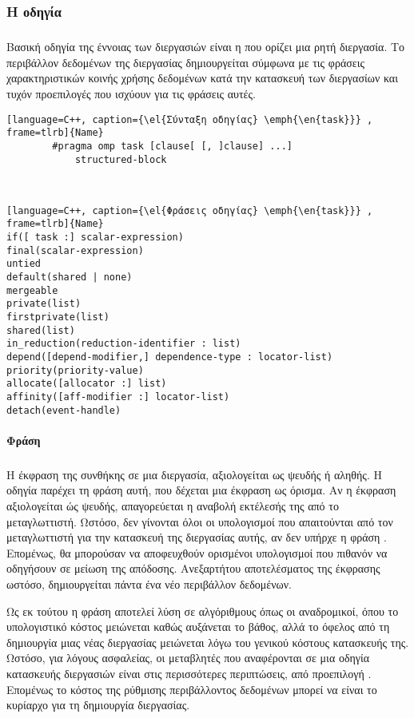 \subsubsection{Η οδηγία \emph{}}
\subparagraph{}
	Βασική οδηγία της έννοιας των διεργασιών είναι η \emph{} που ορίζει μια ρητή διεργασία. Το περιβάλλον δεδομένων της διεργασίας δημιουργείται σύμφωνα με τις φράσεις χαρακτηριστικών κοινής χρήσης δεδομένων κατά την κατασκευή των διεργασίων και τυχόν προεπιλογές που ισχύουν για τις φράσεις αυτές\cite{thenextstep20}.
	
\begin{lstlisting}[language=C++, caption={\el{Σύνταξη οδηγίας} \emph{\en{task}}} , frame=tlrb]{Name}
		#pragma omp task [clause[ [, ]clause] ...] 
			structured-block 
\end{lstlisting}
\ \\
\begin{lstlisting}[language=C++, caption={\el{Φράσεις οδηγίας} \emph{\en{task}}} , frame=tlrb]{Name}
if([ task :] scalar-expression) 
final(scalar-expression) 
untied 
default(shared | none) 
mergeable 
private(list) 
firstprivate(list) 
shared(list) 
in_reduction(reduction-identifier : list) 
depend([depend-modifier,] dependence-type : locator-list) 
priority(priority-value) 
allocate([allocator :] list) 
affinity([aff-modifier :] locator-list) 
detach(event-handle)
\end{lstlisting}

\paragraph{Φράση }
\subparagraph{}
Η έκφραση της συνθήκης \emph{} σε μια διεργασία, αξιολογείται ως ψευδής ή αληθής. 
Η οδηγία \emph{} παρέχει τη φράση αυτή, που δέχεται μια έκφραση ως όρισμα. Αν η έκφραση αξιολογείται ώς ψευδής, απαγορεύεται η αναβολή εκτέλεσής της από το μεταγλωττιστή. Ωστόσο, δεν γίνονται όλοι οι υπολογισμοί που απαιτούνται από τον μεταγλωττιστή για την κατασκευή της διεργασίας αυτής, αν δεν υπήρχε η φράση \emph{}. Επομένως, θα μπορούσαν να αποφευχθούν ορισμένοι υπολογισμοί που πιθανόν να οδηγήσουν σε μείωση της απόδοσης.
Ανεξαρτήτου αποτελέσματος της έκφρασης ωστόσο, δημιουργείται πάντα ένα νέο περιβάλλον δεδομένων.

Ως εκ τούτου η φράση \emph{} αποτελεί λύση σε αλγόριθμους όπως οι αναδρομικοί, όπου
το υπολογιστικό κόστος μειώνεται καθώς αυξάνεται το βάθος, αλλά το όφελος από τη δημιουργία μιας νέας διεργασίας
μειώνεται λόγω του γενικού κόστους κατασκευής της.
Ωστόσο, για λόγους ασφαλείας, οι μεταβλητές που αναφέρονται σε μια οδηγία κατασκευής διεργασιών είναι στις περισσότερες περιπτώσεις, από προεπιλογή \emph{}\cite{parallel_dist}. Επομένως το κόστος
της ρύθμισης περιβάλλοντος δεδομένων μπορεί να είναι το κυρίαρχο για τη δημιουργία διεργασίας.



